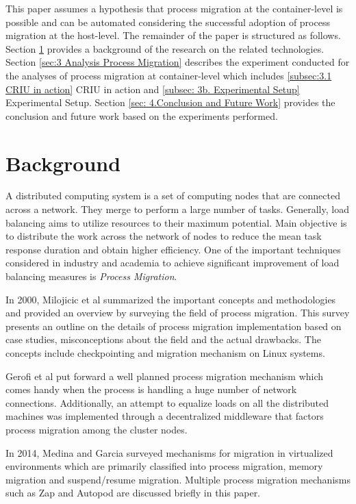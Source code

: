 \documentclass[conference]{IEEEtran}
\begin{document}
This paper assumes a hypothesis that process migration at the container-level is possible and can be automated considering the successful adoption of process migration at the host-level. The remainder of the paper is structured as follows. Section \ref{sec: 2.Background} provides a background of the research on the related technologies. Section \ref{sec:3 Analysis Process Migration} describes the experiment conducted  for the analyses of process migration at container-level which includes \ref{subsec:3.1 CRIU in action} CRIU in action and \ref{subsec: 3b. Experimental Setup} Experimental Setup. Section \ref{sec: 4.Conclusion and Future Work} provides the conclusion and future work based on the experiments performed.  

\section{Background}
\label{sec: 2.Background}

A distributed computing system\cite{Salman2014TheSystems} is a set of computing nodes that are connected across a network. They merge to perform a large number of tasks. Generally, load balancing aims to utilize resources to their maximum potential. Main objective is to distribute the work across the network of nodes to reduce the mean task response duration and obtain higher efficiency. One of the important techniques considered in industry and academia to achieve significant improvement of load balancing measures is \emph{Process Migration}. 

In 2000, Milojicic et al \cite{Milojicic2000ProcessMigration} summarized the important concepts and methodologies and provided an overview by surveying the field of process migration. This survey presents an outline on the details of process migration implementation based on case studies, misconceptions about the field and the actual drawbacks. The concepts include checkpointing and migration mechanism on Linux systems.

Gerofi et al \cite{Gerofi2010AnEnvironments} put forward a well planned process migration mechanism which comes handy when the process is handling a huge number of network connections. Additionally, an attempt to equalize loads on all the distributed machines was implemented through a decentralized middleware that factors process migration among the cluster nodes.

In 2014, Medina and Garcia \cite{Medina2014AMachines} surveyed mechanisms for migration in virtualized environments which are primarily classified into process migration, memory migration and suspend/resume migration. Multiple process migration mechanisms such as Zap\cite{Osman2002TheZap} and Autopod \cite{Potter2005AutoPod:Loss}  are discussed briefly in this paper.
\end{document}
